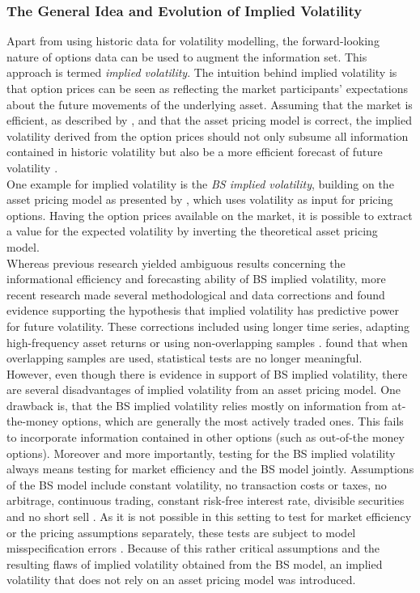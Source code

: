\subsubsection{The General Idea and Evolution of Implied Volatility}
Apart from using historic data for volatility modelling, the forward-looking nature of options data can be used to augment the information set. This approach is termed \emph{implied volatility}. The intuition behind implied volatility is that option prices can be seen as reflecting the market participants' expectations about the future movements of the underlying asset. Assuming that the market is efficient, as described by \textcite{fama1970}, and that the asset pricing model is correct, the implied volatility derived from the option prices should not only subsume all information contained in historic volatility but also be a more efficient forecast of future volatility \parencite{jiang2003}. \\
One example for implied volatility is the \emph{\ac{BS} implied volatility}, building on the asset pricing model as presented by \textcite{black1973}, which uses volatility as input for pricing options. Having the option prices available on the market, it is possible to extract a value for the expected volatility by inverting the theoretical asset pricing model. \\
Whereas previous research yielded ambiguous results concerning the informational efficiency and forecasting ability of \ac{BS} implied volatility, more recent research made several methodological and data corrections and found evidence supporting the hypothesis that implied volatility has predictive power for future volatility. These corrections included using longer time series, adapting high-frequency asset returns or using non-overlapping samples \parencite{jiang2003}. \textcite{christensen2001} found that when overlapping samples are used, statistical tests are no longer meaningful.\\
However, even though there is evidence in support of \ac{BS} implied volatility, there are several disadvantages of implied volatility from an asset pricing model. One drawback is, that the \ac{BS} implied volatility relies mostly on information from at-the-money options, which are generally the most actively traded ones. This fails to incorporate information contained in other options (such as out-of-the money options). Moreover and more importantly, testing for the \ac{BS} implied volatility always means testing for market efficiency and the \ac{BS} model jointly. Assumptions of the \ac{BS} model include constant volatility, no transaction costs or taxes, no arbitrage, continuous trading, constant risk-free interest rate, divisible securities and no short sell \parencite{poon2003}. As it is not possible in this setting to test for market efficiency or the pricing assumptions separately, these tests are subject to model misspecification errors \parencite{jiang2003}. Because of this rather critical assumptions and the resulting flaws of implied volatility obtained from the \ac{BS} model, an implied volatility that does not rely on an asset pricing model was introduced. 


